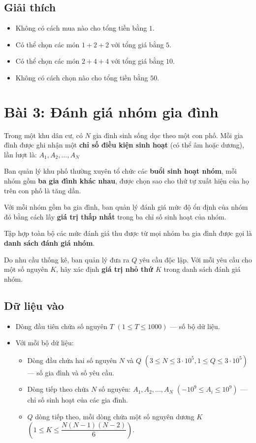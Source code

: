 \subsection*{Giải thích}

\begin{itemize}
    \item Không có cách mua nào cho tổng tiền bằng $1$.
    \item Có thể chọn các món $1+2+2$ với tổng giá bằng $5$.
    \item Có thể chọn các món $2+4+4$ với tổng giá bằng $10$.
    \item Không có cách chọn nào cho tổng tiền bằng $50$.
\end{itemize}

\section*{Bài 3: Đánh giá nhóm gia đình}

Trong một khu dân cư, có $N$ gia đình sinh sống dọc theo một con phố.
Mỗi gia đình được ghi nhận một \textbf{chỉ số điều kiện sinh hoạt} (có thể âm hoặc dương),
lần lượt là: $A_1, A_2, \ldots, A_N$

Ban quản lý khu phố thường xuyên tổ chức các \textbf{buổi sinh hoạt nhóm},
mỗi nhóm gồm \textbf{ba gia đình khác nhau}, được chọn sao cho thứ tự xuất hiện
của họ trên con phố là tăng dần.

Với mỗi nhóm gồm ba gia đình, ban quản lý đánh giá mức độ ổn định của nhóm đó
bằng cách lấy \textbf{giá trị thấp nhất} trong ba chỉ số sinh hoạt của nhóm.

Tập hợp toàn bộ các mức đánh giá thu được từ mọi nhóm ba gia đình
được gọi là \textbf{danh sách đánh giá nhóm}.

Do nhu cầu thống kê, ban quản lý đưa ra $Q$ yêu cầu độc lập.
Với mỗi yêu cầu cho một số nguyên $K$, hãy xác định
\textbf{giá trị nhỏ thứ $K$} trong danh sách đánh giá nhóm.

\subsection*{Dữ liệu vào}

\begin{itemize}
    \item Dòng đầu tiên chứa số nguyên $T$ $(1 \le T \le 1000)$ --- số bộ dữ liệu.
    \item Với mỗi bộ dữ liệu:
    \begin{itemize}
        \item Dòng đầu chứa hai số nguyên $N$ và $Q$ $(3 \le N \le 3 \cdot 10^5, 1 \le Q \le 3 \cdot 10^5)$ --- số gia đình và số yêu cầu.
        \item Dòng tiếp theo chứa $N$ số nguyên: $A_1, A_2, \ldots, A_N$ $(-10^9 \le A_i \le 10^9)$ --- chỉ số sinh hoạt của các gia đình.
        \item $Q$ dòng tiếp theo, mỗi dòng chứa một số nguyên dương $K$ $(1 \le K \le \dfrac{N(N-1)(N-2)}{6})$.
    \end{itemize}
\end{itemize}

